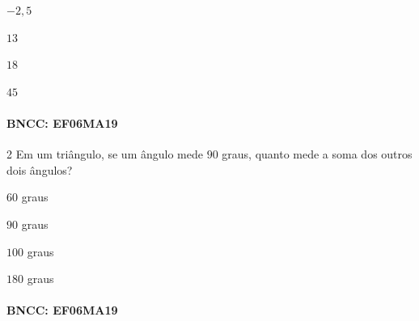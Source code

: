 {\begin{escolha}
\item $-2,5$
\item $13$
\item $18$
\item $45$
\end{escolha}

\paragraph{BNCC: EF06MA19}


\num{2}  Em um triângulo, se um ângulo mede $90$ graus, quanto mede a soma dos
outros dois ângulos?

\begin{escolha}
\item $60$ graus
\item $90$ graus
\item $100$ graus
\item $180$ graus
\end{escolha}

\paragraph{BNCC: EF06MA19 }


}
